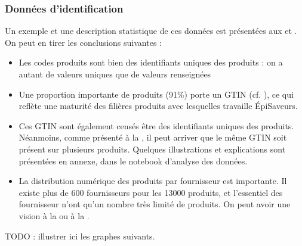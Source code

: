                 \subsubsection{Données d'identification}
                Un exemple et une description statistique de ces données est présentées aux  et .
                On peut en tirer les conclusions suivantes : 
                \begin{itemize}
                    \item Les codes produits sont bien des identifiants uniques des produits : on a autant de valeurs uniques que de valeurs renseignées
                    \item Une proportion importante de produits (91\%) porte un GTIN (cf. \cite{GS1_GTIN}), ce qui reflète une \og maturité \fg des filières produits avec lesquelles travaille \'{E}piSaveurs.
                    \item Ces GTIN sont également censés être des identifiants uniques des produits. Néanmoins, comme présenté à la , il peut arriver que le même GTIN soit présent sur plusieurs produits. Quelques illustrations et explications sont présentées en annexe, dans le notebook d'analyse des données.
                    \item La distribution numérique des produits par fournisseur est importante. Il existe plus de 600 fournisseurs pour les 13000 produits, et l'essentiel des fournisseur n'ont qu'un nombre très limité de produits. On peut avoir une vision à la  ou à la .
                \end{itemize}

                TODO : illustrer ici les graphes suivants.

                \begin{figure}[htbp]\CenterFloatBoxes
                    \begin{floatrow}
                    \end{floatrow}
                \end{figure}        

